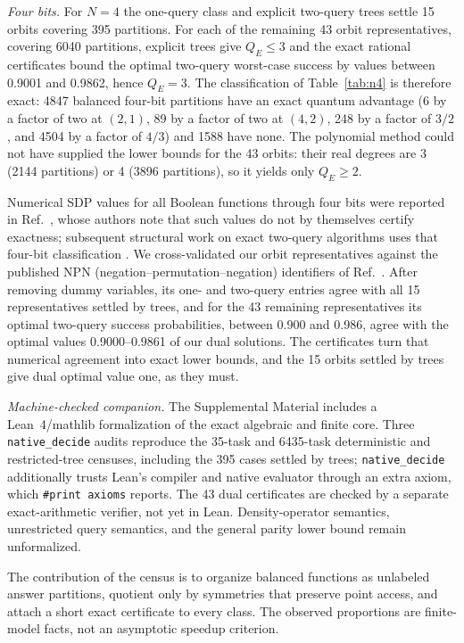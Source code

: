\documentclass[
  aps,
  pra,
  reprint,
  nofootinbib
]{revtex4-2}
\begin{document}
\emph{Four bits.} For \(N=4\) the one-query class and explicit two-query trees
settle 15 orbits covering 395 partitions. For each of the remaining 43 orbit
representatives, covering 6040 partitions, explicit trees give \(Q_E\le3\) and
the exact rational certificates bound the optimal two-query worst-case success
by values between 0.9001 and 0.9862, hence \(Q_E=3\). The classification of Table~\ref{tab:n4} is
therefore exact: 4847 balanced four-bit partitions have an exact quantum
advantage (6 by a factor of two at \((2,1)\), 89 by a factor of two at
\((4,2)\), 248 by a factor of \(3/2\), and 4504 by a factor of \(4/3\)) and
1588 have none. The polynomial method could not have supplied the lower bounds
for the 43 orbits: their real degrees are 3 (2144 partitions) or 4 (3896
partitions), so it yields only \(Q_E\ge2\).

Numerical SDP values for all Boolean functions through four bits were reported
in Ref.~\cite{MontanaroJozsaMitchison2015}, whose authors note that such values
do not by themselves certify exactness; subsequent structural work on exact
two-query algorithms uses that four-bit classification
\cite{YeYangHuang2024}. We cross-validated our orbit representatives against
the published NPN (negation--permutation--negation) identifiers of
Ref.~\cite{MontanaroJozsaMitchison2015}. After removing dummy variables, its
one- and two-query entries agree with all 15 representatives settled by trees,
and for the 43 remaining representatives its optimal two-query success
probabilities, between 0.900 and 0.986, agree with the optimal values
0.9000--0.9861 of our dual solutions. The certificates turn that numerical
agreement into exact lower bounds, and the 15 orbits settled by trees give
dual optimal value one, as they must.

\emph{Machine-checked companion.} The Supplemental Material includes a
Lean~4/mathlib formalization of the exact algebraic and finite core. Three
\texttt{native\_decide} audits reproduce the 35-task and 6435-task
deterministic and restricted-tree censuses, including the 395 cases settled by
trees; \texttt{native\_decide} additionally trusts Lean's compiler and native
evaluator through an extra axiom, which \texttt{\#print axioms} reports. The
43 dual certificates are checked by a separate exact-arithmetic verifier, not
yet in Lean. Density-operator semantics, unrestricted query semantics, and the
general parity lower bound remain unformalized.

The contribution of the census is to organize balanced functions as unlabeled
answer partitions, quotient only by symmetries that preserve point access, and
attach a short exact certificate to every class. The observed proportions are
finite-model facts, not an asymptotic speedup criterion.
\end{document}
